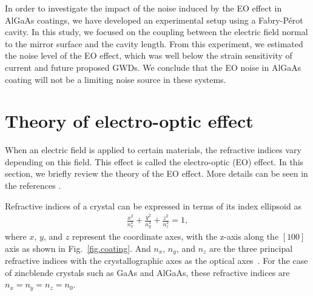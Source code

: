 In order to investigate the impact of the noise induced by the EO effect in AlGaAs coatings, we have developed an experimental setup using a Fabry-P\'erot cavity.
In this study, we focused on the coupling between the electric field normal to the mirror surface and the cavity length.
From this experiment, we estimated the noise level of the EO effect, which was well below the strain sensitivity of current and future proposed GWDs.
We conclude that the EO noise in AlGaAs coating will not be a limiting noise source in these systems.

\section{Theory of electro-optic effect}
When an electric field is applied to certain materials, the refractive indices vary depending on this field.
This effect is called the electro-optic (EO) effect.
In this section, we briefly review the theory of the EO effect.
More details can be seen in the references \cite{Namba1961,yariv}.

Refractive indices of a crystal can be expressed in terms of its index ellipsoid as
\begin{align}
    \frac{x^2}{n_x^2} + \frac{y^2}{n_y^2} + \frac{z^2}{n_z^2} = 1,
    \label{eq.index}
\end{align}
where $x$, $y$, and $z$ represent the coordinate axes, with the z-axis along the $[100]$ axis as shown in Fig.~\ref{fig.coating}.
And $n_x$, $n_y$, and $n_z$ are the three principal refractive indices with the crystallographic axes as the optical axes~\cite{yariv}.
For the case of zincblende crystals such as GaAs and AlGaAs, these refractive indices are $n_x=n_y=n_z=n_0$.

